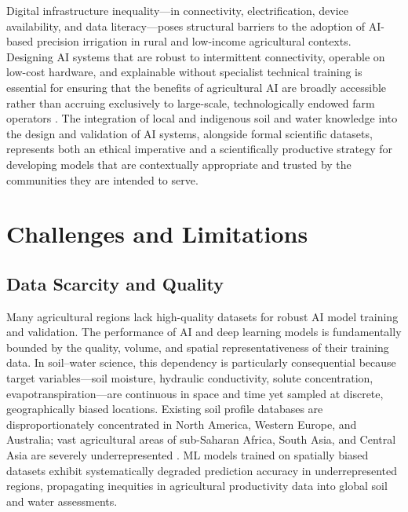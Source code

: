\documentclass[land,article,submit,pdftex,moreauthors]{Definitions/mdpi}
\numberwithin{equation}{section}
\begin{document}
Digital infrastructure inequality---in connectivity, electrification, device availability, and data literacy---poses structural barriers to the adoption of AI-based precision irrigation in rural and low-income agricultural contexts. Designing AI systems that are robust to intermittent connectivity, operable on low-cost hardware, and explainable without specialist technical training is essential for ensuring that the benefits of agricultural AI are broadly accessible rather than accruing exclusively to large-scale, technologically endowed farm operators \citep{shepherd2022ethics}. The integration of local and indigenous soil and water knowledge into the design and validation of AI systems, alongside formal scientific datasets, represents both an ethical imperative and a scientifically productive strategy for developing models that are contextually appropriate and trusted by the communities they are intended to serve.

\section{Challenges and Limitations}

\subsection{Data Scarcity and Quality}

Many agricultural regions lack high-quality datasets for robust AI model training and validation. The performance of AI and deep learning models is fundamentally bounded by the quality, volume, and spatial representativeness of their training data. In soil--water science, this dependency is particularly consequential because target variables---soil moisture, hydraulic conductivity, solute concentration, evapotranspiration---are continuous in space and time yet sampled at discrete, geographically biased locations. Existing soil profile databases are disproportionately concentrated in North America, Western Europe, and Australia; vast agricultural areas of sub-Saharan Africa, South Asia, and Central Asia are severely underrepresented \citep{hengl2017soilgrids250m}. ML models trained on spatially biased datasets exhibit systematically degraded prediction accuracy in underrepresented regions, propagating inequities in agricultural productivity data into global soil and water assessments.
\end{document}

